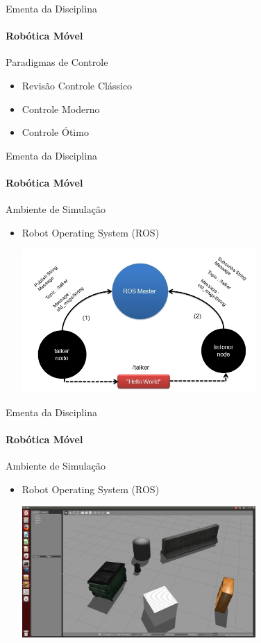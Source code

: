 \documentclass{beamer}
\begin{document}
\begin{frame}[c]{Ementa da Disciplina}
	\framesubtitle{Robótica Móvel}
	\begin{block}{Paradigmas de Controle}
	\end{block}
	\begin{itemize}
		\item Revisão Controle Clássico
        \item Controle Moderno
        \item Controle Ótimo
	\end{itemize}
\end{frame}


\begin{frame}[t]{Ementa da Disciplina}
	\framesubtitle{Robótica Móvel}
	\begin{block}{Ambiente de Simulação}
	\end{block}
	\begin{itemize}
		\item  Robot Operating System (ROS)
		\begin{center}
			\includegraphics[width=0.7\textwidth]{../images/ros_msgs.png}	
		\end{center}
	\end{itemize}
\end{frame}



\begin{frame}[t]{Ementa da Disciplina}
	\framesubtitle{Robótica Móvel}
	\begin{block}{Ambiente de Simulação}
	\end{block}

	\begin{itemize}
		\item  Robot Operating System (ROS)
		\begin{center}
			\includegraphics[width=0.7\textwidth]{../images/ros_example.png}	
		\end{center}
	\end{itemize}
\end{frame}
\end{document}
